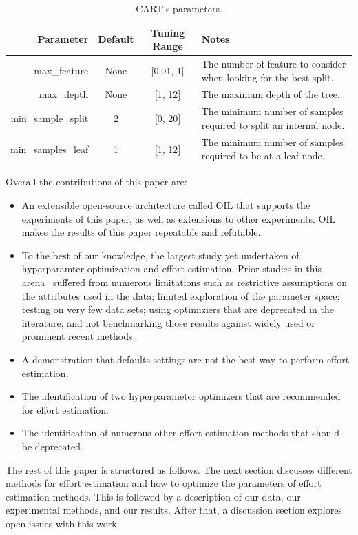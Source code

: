 \documentclass[10pt,conference]{IEEEtran}
\newcommand{\bi}{\begin{itemize}}
\newcommand{\ei}{\end{itemize}}
\begin{document}
\begin{table}[!t]
\centering
\caption{CART's parameters.}\label{tbl:cart}
\begin{tabular}{r|c|c|p{3.2in}}
Parameter          & Default & Tuning Range  & Notes                                                            \\\hline
max\_feature       & None    & {[}0.01, 1{]} & The number of feature to consider when looking for the best split. \\\hline 
max\_depth         & None    & {[}1, 12{]}   & The maximum depth of the tree.                                     \\\hline 
min\_sample\_split & 2       & {[}0, 20{]}   & The minimum number of samples required to split an internal node.  \\\hline 
min\_samples\_leaf & 1       & {[}1, 12{]}   & The minimum number of samples required to be at a leaf node.      
\end{tabular}
\end{table}





Overall the contributions of this paper are:
\bi
\item An extensible open-source architecture called OIL that supports the experiments of this paper,
as well as extensions to other experiments. OIL makes the results of this paper repeatable and refutable.
\item
To the best of our knowledge, the largest study yet undertaken of hyperparamter optimization and effort estimation. Prior studies in this arena~\cite{dejaeger12,Moeyersoms:2015,li09,ekrem09,singh2012software,aljahdali2010software,Song:2013,IJST70010,Rao14,Khatibi13} suffered  from  numerous  limitations  such  as
restrictive  assumptions  on  the
attributes
used  in  the  data;
limited  exploration  of  the  parameter  space;  testing  on  very
few  data  sets;  using  optimiziers  that  are  deprecated  in  the
literature;  and  not  benchmarking those  results  against
widely used or prominent recent methods.
\item A demonstration that defaults settings are not the best way to perform effort estimation.
\item The identification of two hyperparameter optimizers that are recommended for effort estimation.
 \item The identification of numerous other effort estimation methods that should be deprecated.
\ei
The rest of this paper is structured as follows.
The next section discusses different methods for effort estimation and how to optimize
the parameters of effort estimation methods. This is followed by a description of our data, our experimental
methods, and our results. After that, a discussion section explores open issues with this work. 
\end{document}
